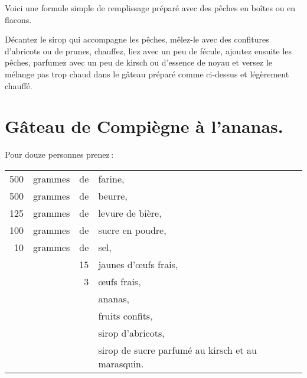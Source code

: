 Voici une formule simple de remplissage préparé avec des pêches en boîtes ou
en flacons.

Décantez le sirop qui accompagne les pêches, mêlez-le avec des confitures
d'abricots ou de prunes, chauffez, liez avec un peu de fécule, ajoutez ensuite
les pêches, parfumez avec un peu de kirsch ou d'essence de noyau et versez le
mélange pas trop chaud dans le gâteau préparé comme ci-dessus et légèrement
chauffé.

\section*{\centering Gâteau de Compiègne à l'ananas.}
{}

Pour douze personnes prenez :

\footnotesize
\begin{longtable}{rrrp{16em}}
    500 & grammes & de & farine,                                                                          \\
    500 & grammes & de & beurre,                                                                          \\
    125 & grammes & de & levure de bière,                                                                 \\
    100 & grammes & de & sucre en poudre,                                                                 \\
     10 & grammes & de & sel,                                                                             \\
        &         & 15 & jaunes d'œufs frais,                                                             \\
        &         &  3 & œufs frais,                                                                      \\
        &         &    & ananas,                                                                          \\
        &         &    & fruits confits,                                                                  \\
        &         &    & sirop d'abricots,                                                                \\
        &         &    & sirop de sucre parfumé au kirsch et au marasquin.                                \\
\end{longtable}
\normalsize

